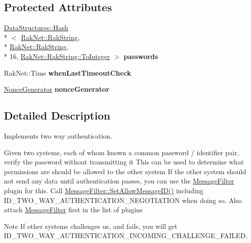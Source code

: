 \subsection*{Protected Attributes}
\begin{DoxyCompactItemize}
\item 
\hypertarget{class_rak_net_1_1_two_way_authentication_a89b2d290e5760d34bf1f44b7e4363553}{\hyperlink{class_data_structures_1_1_hash}{Data\-Structures\-::\-Hash}\\*
$<$ \hyperlink{class_rak_net_1_1_rak_string}{Rak\-Net\-::\-Rak\-String}, \\*
\hyperlink{class_rak_net_1_1_rak_string}{Rak\-Net\-::\-Rak\-String}, \\*
16, \hyperlink{class_rak_net_1_1_rak_string_a79f546baedf74c64a820297b40590250}{Rak\-Net\-::\-Rak\-String\-::\-To\-Integer} $>$ {\bfseries passwords}}\label{class_rak_net_1_1_two_way_authentication_a89b2d290e5760d34bf1f44b7e4363553}

\item 
\hypertarget{class_rak_net_1_1_two_way_authentication_a105195e0b6c3e3f97d82058e59f63832}{Rak\-Net\-::\-Time {\bfseries when\-Last\-Timeout\-Check}}\label{class_rak_net_1_1_two_way_authentication_a105195e0b6c3e3f97d82058e59f63832}

\item 
\hypertarget{class_rak_net_1_1_two_way_authentication_a4c3268cb78d14bc8504a3e5b923d7e20}{\hyperlink{struct_rak_net_1_1_two_way_authentication_1_1_nonce_generator}{Nonce\-Generator} {\bfseries nonce\-Generator}}\label{class_rak_net_1_1_two_way_authentication_a4c3268cb78d14bc8504a3e5b923d7e20}

\end{DoxyCompactItemize}


\subsection{Detailed Description}
Implements two way authentication. 

Given two systems, each of whom known a common password / identifier pair, verify the password without transmitting it This can be used to determine what permissions are should be allowed to the other system If the other system should not send any data until authentication passes, you can use the \hyperlink{class_rak_net_1_1_message_filter}{Message\-Filter} plugin for this. Call \hyperlink{class_rak_net_1_1_message_filter_a480178a464758a5c61dffb631a4d37e7}{Message\-Filter\-::\-Set\-Allow\-Message\-I\-D()} including I\-D\-\_\-\-T\-W\-O\-\_\-\-W\-A\-Y\-\_\-\-A\-U\-T\-H\-E\-N\-T\-I\-C\-A\-T\-I\-O\-N\-\_\-\-N\-E\-G\-O\-T\-I\-A\-T\-I\-O\-N when doing so. Also attach \hyperlink{class_rak_net_1_1_message_filter}{Message\-Filter} first in the list of plugins \begin{DoxyNote}{Note}
If other systems challenges us, and fails, you will get I\-D\-\_\-\-T\-W\-O\-\_\-\-W\-A\-Y\-\_\-\-A\-U\-T\-H\-E\-N\-T\-I\-C\-A\-T\-I\-O\-N\-\_\-\-I\-N\-C\-O\-M\-I\-N\-G\-\_\-\-C\-H\-A\-L\-L\-E\-N\-G\-E\-\_\-\-F\-A\-I\-L\-E\-D. 
\end{DoxyNote}


